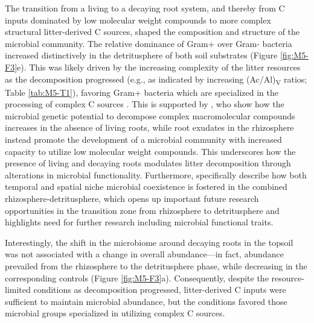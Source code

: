 The transition from a living to a decaying root system, and thereby from C inputs dominated by low molecular weight compounds to more complex structural litter-derived C sources, shaped the composition and structure of the microbial community. The relative dominance of Gram+ over Gram- bacteria increased distinctively in the detritusphere of both soil substrates (Figure \ref{fig:M5-F3}e). This was likely driven by the increasing complexity of the litter resources as the decomposition progressed (e.g., as indicated by increasing (Ac/Al)\textsubscript{V} ratios; Table \ref{tab:M5-T1}), favoring Gram+ bacteria which are specialized in the processing of complex C sources \citep{Fanin2019, Denef2009, Butler2003}. This is supported by \citet{Shi2018}, who show how the microbial genetic potential to decompose complex macromolecular compounds increases in the absence of living roots, while root exudates in the rhizosphere instead promote the development of a microbial community with increased capacity to utilize low molecular weight compounds. This underscores how the presence of living and decaying roots modulates litter decomposition through alterations in microbial functionality. Furthermore, \citet{Nuccio2020} specifically describe how both temporal and spatial niche microbial coexistence is fostered in the combined rhizosphere-detritusphere, which opens up important future research opportunities in the transition zone from rhizosphere to detritusphere and highlights need for further research including microbial functional traits.

Interestingly, the shift in the microbiome around decaying roots in the topsoil was not associated with a change in overall abundance---in fact, abundance prevailed from the rhizosphere to the detritusphere phase, while decreasing in the corresponding controls (Figure \ref{fig:M5-F3}a). Consequently, despite the resource-limited conditions as decomposition progressed, litter-derived C inputs were sufficient to maintain microbial abundance, but the conditions favored those microbial groups specialized in utilizing complex C sources.

